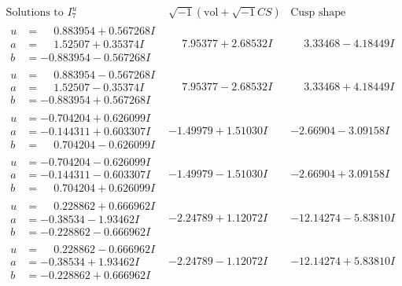 \documentclass[1p]{elsarticle_modified}
\theoremstyle{definition}
\newcommand{\I}{\sqrt{-1}}
\begin{document}
$$\begin{array}{c|c|c}  
\text{Solutions to }I^u_{7}& \I (\text{vol} + \sqrt{-1}CS) & \text{Cusp shape}\\
 \hline 
\begin{aligned}
u &= \phantom{-}0.883954 + 0.567268 I \\
a &= \phantom{-}1.52507 + 0.35374 I \\
b &= -0.883954 - 0.567268 I\end{aligned}
 & \phantom{-}7.95377 + 2.68532 I & \phantom{-}3.33468 - 4.18449 I \\ \hline\begin{aligned}
u &= \phantom{-}0.883954 - 0.567268 I \\
a &= \phantom{-}1.52507 - 0.35374 I \\
b &= -0.883954 + 0.567268 I\end{aligned}
 & \phantom{-}7.95377 - 2.68532 I & \phantom{-}3.33468 + 4.18449 I \\ \hline\begin{aligned}
u &= -0.704204 + 0.626099 I \\
a &= -0.144311 + 0.603307 I \\
b &= \phantom{-}0.704204 - 0.626099 I\end{aligned}
 & -1.49979 + 1.51030 I & -2.66904 - 3.09158 I \\ \hline\begin{aligned}
u &= -0.704204 - 0.626099 I \\
a &= -0.144311 - 0.603307 I \\
b &= \phantom{-}0.704204 + 0.626099 I\end{aligned}
 & -1.49979 - 1.51030 I & -2.66904 + 3.09158 I \\ \hline\begin{aligned}
u &= \phantom{-}0.228862 + 0.666962 I \\
a &= -0.38534 - 1.93462 I \\
b &= -0.228862 - 0.666962 I\end{aligned}
 & -2.24789 + 1.12072 I & -12.14274 - 5.83810 I \\ \hline\begin{aligned}
u &= \phantom{-}0.228862 - 0.666962 I \\
a &= -0.38534 + 1.93462 I \\
b &= -0.228862 + 0.666962 I\end{aligned}
 & -2.24789 - 1.12072 I & -12.14274 + 5.83810 I \\ \hline\begin{aligned}

\end{aligned}
\end{array}$$
\end{document}
